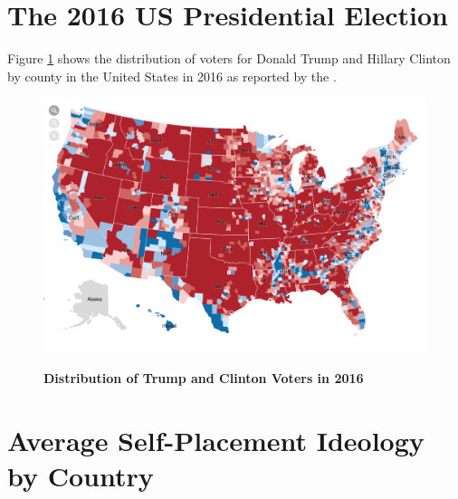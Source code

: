 \documentclass[12pt, titlepage]{article}
\newcommand\tb{\textbf}
\begin{document}
\begin{appendices}
	
\section{The 2016 US Presidential Election}
\label{AppendixE}

Figure \ref{figure3} shows the distribution of voters for Donald Trump and Hillary Clinton by county in the United States in 2016 as reported by the  \cite{NYT-trump}.

\begin{figure}[H]    \centering
	{	 \includegraphics[width=\textwidth]{NYT}}
	\caption{\tb{Distribution of Trump and Clinton Voters in 2016}}\label{figure3}
\end{figure}	

\clearpage

\section{Average Self-Placement Ideology by Country}
\label{AppendixF}


\end{appendices}
\end{document}
